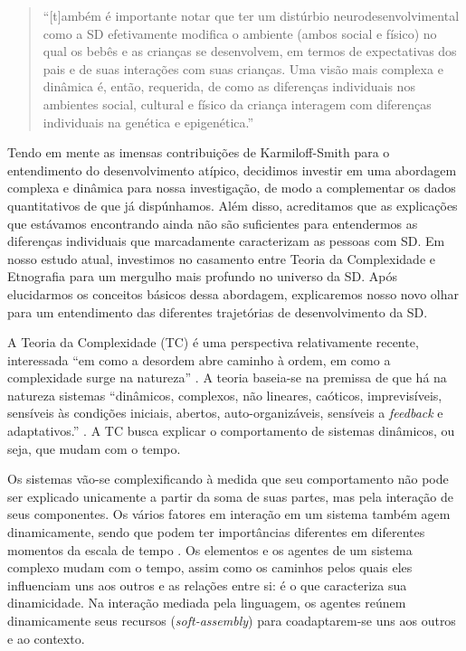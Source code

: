 \documentclass[output=paper,colorlinks,citecolor=brown,booklanguage=portuguese]{langscibook}
\begin{document}
\begin{quote}
    “[t]ambém é importante notar que ter um distúrbio neurodesenvolvimental como a SD efetivamente modifica o ambiente (ambos social e físico) no qual os bebês e as crianças se desenvolvem, em termos de expectativas dos pais e de suas interações com suas crianças. Uma visão mais complexa e dinâmica é, então, requerida, de como as diferenças individuais nos ambientes social, cultural e físico da criança interagem com diferenças individuais na genética e epigenética.”
\end{quote}

Tendo em mente as imensas contribuições de Karmiloff-Smith para o entendimento do desenvolvimento atípico, decidimos investir em uma abordagem complexa e dinâmica para nossa investigação, de modo a complementar os dados quantitativos de que já dispúnhamos. Além disso, acreditamos que as explicações que estávamos encontrando ainda não são suficientes para entendermos as diferenças individuais que marcadamente caracterizam as pessoas com SD. Em nosso estudo atual, investimos no casamento entre Teoria da Complexidade e Etnografia para um mergulho mais profundo no universo da SD. Após elucidarmos os conceitos básicos dessa abordagem, explicaremos nosso novo olhar para um entendimento das diferentes trajetórias de desenvolvimento da SD.

A Teoria da Complexidade (TC) é uma perspectiva relativamente recente, interessada “em como a desordem abre caminho à ordem, em como a complexidade surge na natureza” \citep[141]{LarsenFreeman1997}. A teoria baseia-se na premissa de que há na natureza sistemas “dinâmicos, complexos, não lineares, caóticos, imprevisíveis, sensíveis às condições iniciais, abertos, auto-organizáveis, sensíveis a \emph{feedback} e adaptativos.” \citep[142]{LarsenFreeman1997}. A TC busca explicar o comportamento de sistemas dinâmicos, ou seja, que mudam com o tempo.

Os sistemas vão-se complexificando à medida que seu comportamento não pode ser explicado unicamente a partir da soma de suas partes, mas pela interação de seus componentes. Os vários fatores em interação em um sistema também agem dinamicamente, sendo que podem ter importâncias diferentes em diferentes momentos da escala de tempo \citep{LarsenFreeman1997, LarsenFreeman2012, LarsenFreeman2008}. Os elementos e os agentes de um sistema complexo mudam com o tempo, assim como os caminhos pelos quais eles influenciam uns aos outros e as relações entre si: é o que caracteriza sua dinamicidade. Na interação mediada pela linguagem, os agentes reúnem dinamicamente seus recursos (\emph{soft-assembly}) para coadaptarem-se uns aos outros e ao contexto.
\end{document}
